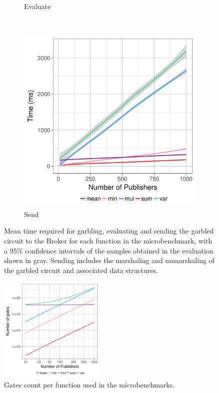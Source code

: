 \begin{figure}
\begin{subfigure}[b]{0.32\textwidth}
        \caption{Evaluate}
        \label{fig:micro-eval-time}
    \end{subfigure}
    ~ %
    \begin{subfigure}[b]{0.32\textwidth}
        \includegraphics[width=\textwidth]{plots/send.png}
        \caption{Send}
        \label{fig:micro-send-time}
    \end{subfigure}
    \caption{Mean time required for garbling, evaluating and sending the
    garbled circuit to the Broker for each function in the microbenchmark, with
    a 95\% confidence intervals of the samples obtained in the evaluation shown
    in gray.  Sending includes the marshaling and unmarshaling of the garbled
    circuit and associated data structures.}\label{fig:micro-times}
\end{figure}


\begin{figure}
  \includegraphics[width=0.45\textwidth]{plots/nonxor_gates_log.png}
  \caption{Gates count per function used in the microbenchmarks.}
  \label{micro-nonxor}
\end{figure}

